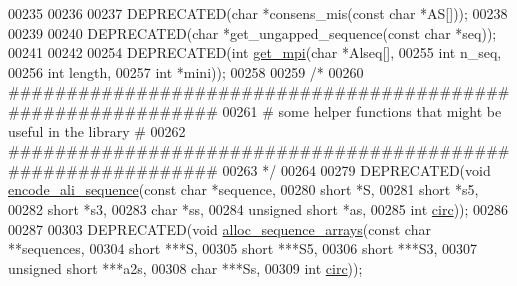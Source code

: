 \begin{DoxyCode}
00235 
00236 
00237 DEPRECATED(\textcolor{keywordtype}{char} *consens\_mis(\textcolor{keyword}{const} \textcolor{keywordtype}{char} *AS[]));
00238 
00239 
00240 DEPRECATED(\textcolor{keywordtype}{char} *get\_ungapped\_sequence(\textcolor{keyword}{const} \textcolor{keywordtype}{char} *seq));
00241 
00242 
00254 DEPRECATED(\textcolor{keywordtype}{int} \hyperlink{group__aln__utils_gaa2d600be90844094ec145ea14a314d2f}{get\_mpi}(\textcolor{keywordtype}{char} *Alseq[],
00255                        \textcolor{keywordtype}{int}  n\_seq,
00256                        \textcolor{keywordtype}{int}  length,
00257                        \textcolor{keywordtype}{int}  *mini));
00258 
00259 \textcolor{comment}{/*}
00260 \textcolor{comment}{ #############################################################}
00261 \textcolor{comment}{ # some helper functions that might be useful in the library #}
00262 \textcolor{comment}{ #############################################################}
00263 \textcolor{comment}{ */}
00264 
00279 DEPRECATED(\textcolor{keywordtype}{void} \hyperlink{group__aln__utils_gaa3e40277c837d6f7603afe319884c786}{encode\_ali\_sequence}(\textcolor{keyword}{const} \textcolor{keywordtype}{char}      *sequence,
00280                                     \textcolor{keywordtype}{short}           *S,
00281                                     \textcolor{keywordtype}{short}           *s5,
00282                                     \textcolor{keywordtype}{short}           *s3,
00283                                     \textcolor{keywordtype}{char}            *ss,
00284                                     \textcolor{keywordtype}{unsigned} \textcolor{keywordtype}{short}  *as,
00285                                     \textcolor{keywordtype}{int}             \hyperlink{group__model__details_gaf9202a1a09f5828dc731e2d9a10fa111}{circ}));
00286 
00287 
00303 DEPRECATED(\textcolor{keywordtype}{void}  \hyperlink{group__aln__utils_ga8a560930f7f2582cc3967723a86cfdfa}{alloc\_sequence\_arrays}(\textcolor{keyword}{const} \textcolor{keywordtype}{char}     **sequences,
00304                                        \textcolor{keywordtype}{short}          ***S,
00305                                        \textcolor{keywordtype}{short}          ***S5,
00306                                        \textcolor{keywordtype}{short}          ***S3,
00307                                        \textcolor{keywordtype}{unsigned} \textcolor{keywordtype}{short} ***a2s,
00308                                        \textcolor{keywordtype}{char}           ***Ss,
00309                                        \textcolor{keywordtype}{int}            \hyperlink{group__model__details_gaf9202a1a09f5828dc731e2d9a10fa111}{circ}));

\end{DoxyCode}
